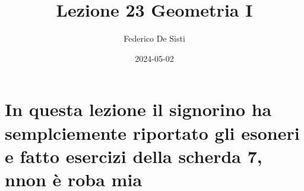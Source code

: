 \documentclass[12px]{article}
\title{Lezione 23 Geometria I}
\date{2024-05-02}
\author{Federico De Sisti}
\begin{document}
	\maketitle
	\newpage
	\section{In questa lezione il signorino ha semplciemente riportato gli esoneri e fatto esercizi della scherda 7, nnon è roba mia}
	
\end{document}
